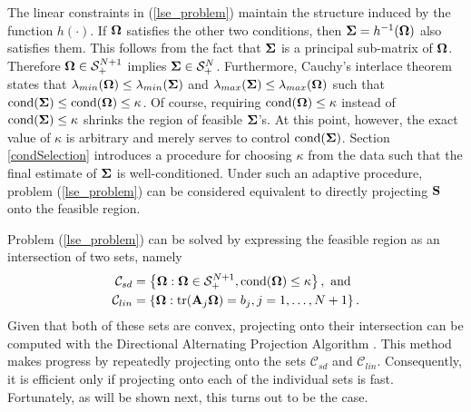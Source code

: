 \documentclass[11pt]{article}
\newcommand{\R}{\mathbb{R}}
\theoremstyle{definition}
\theoremstyle{definition}
\def\bSigma{{\bf \Sigma}}
\def\bOmega{{\bf \Omega}}
\def\A{{\bf A}}
\def\SS{{\bf S}}
\def\cond{\text{cond}}
\def\Tr{\text{tr}}
\begin{document}
The linear constraints in (\ref{lse_problem}) maintain the structure induced by the function $h(\cdot)$. 
If $\bOmega$ satisfies the other two conditions,  then $\bSigma = h^{-1}(\bOmega)$ also satisfies them. This follows from the fact that $\bSigma$ is a principal sub-matrix of $\bOmega$. Therefore $\bOmega \in \mathcal{S}_{+}^{N+1}$ implies $\bSigma \in \mathcal{S}_{+}^{N}$. Furthermore, Cauchy's interlace theorem states that $\lambda_{min}(\bOmega) \leq \lambda_{min}(\bSigma)$ and $\lambda_{max}(\bSigma) \leq \lambda_{max}(\bOmega)$ such that $\cond(\bSigma) \leq \cond(\bOmega) \leq \kappa$. Of course, requiring $\cond(\bOmega) \leq \kappa$ instead of $\cond(\bSigma) \leq \kappa$ shrinks the region of feasible $\bSigma$'s. 
 At this point, however, the exact value of $\kappa$ is arbitrary and merely serves to control $\cond(\bSigma)$.  
 Section \ref{condSelection} introduces a procedure for choosing $\kappa$ from the data such that the final estimate of $\bSigma$ is well-conditioned. Under such an adaptive procedure, problem (\ref{lse_problem}) can be considered equivalent to directly projecting $\SS$ onto the feasible region. 



Problem (\ref{lse_problem}) can be solved by expressing  the feasible region as an intersection of two sets, namely 
\begin{align*}
\mathcal{C}_{sd} &= \left\{\bOmega : \bOmega \in \mathcal{S}_{+}^{N+1}, \cond(\bOmega) \leq \kappa\right\}, \text{ and }\\
\mathcal{C}_{lin} &= \left\{\bOmega : \Tr(\A_j \bOmega) = b_j, j = 1, \dots, N+1\right\}.
\end{align*}
Given that both of these sets are convex, projecting onto their intersection can be computed with the Directional Alternating Projection Algorithm \citep{gubin1967method}. This method makes progress by repeatedly projecting onto the sets $\mathcal{C}_{sd}$ and $\mathcal{C}_{lin}$. Consequently, it is efficient only if projecting onto each of the individual sets is fast. Fortunately, as will be shown next, this turns out to be the case. 
\end{document}
